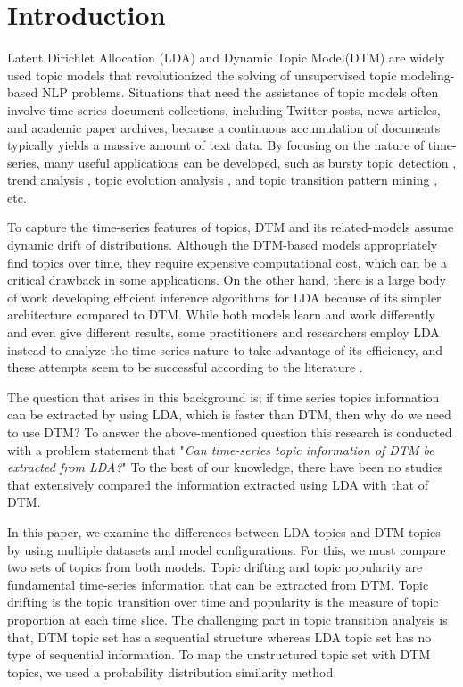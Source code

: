 \chapter{Introduction}
Latent Dirichlet Allocation (LDA) \cite{blei2003latent} and Dynamic Topic Model(DTM) \cite{blei2006dynamic} are widely used topic models that revolutionized the solving of unsupervised topic modeling-based NLP problems.
Situations that need the assistance of topic models often involve time-series document collections, including Twitter posts, news articles, and academic paper archives, because a continuous accumulation of documents typically yields a massive amount of text data.
By focusing on the nature of time-series, many useful applications can be developed, such as bursty topic detection \cite{koike2013time}, trend analysis \cite{kawamae2011trend,zhang2015market,khan2019events}, topic evolution analysis \cite{blei2006dynamic,kalyanam2015context,xie2016topicsketch,amoualian2016streaming,acharya2018dmdtm}, and topic transition pattern mining \cite{kim2015toptrak}, etc.

To capture the time-series features of topics, DTM and its related-models \cite{amoualian2016streaming,acharya2018dmdtm} assume dynamic drift of distributions.
Although the DTM-based models appropriately find topics over time, they require expensive computational cost, which can be a critical drawback in some applications.
On the other hand, there is a large body of work developing efficient inference algorithms for LDA \cite{li2014reducing,yut2017lda,chen2018scalable} because of its simpler architecture compared to DTM.
While both models learn and work differently and even give different results, some practitioners and researchers employ LDA instead to analyze the time-series nature to take advantage of its efficiency, and these attempts seem to be successful according to the literature \cite{khan2019events}.

The question that arises in this background is; if time series topics information can be extracted by using LDA, which is faster than DTM, then why do we need to use DTM?
To answer the above-mentioned question this research is conducted with a problem statement that "\emph{Can time-series topic information of DTM be extracted from LDA?}"
To the best of our knowledge, there have been no studies that extensively compared the information extracted using LDA with that of DTM.

In this paper, we examine the differences between LDA topics and DTM topics by using multiple datasets and model configurations.
For this, we must compare two sets of topics from both models. Topic drifting and topic popularity are fundamental time-series information that can be extracted from DTM. Topic drifting is the topic transition over time and popularity is the measure of topic proportion at each time slice. The challenging part in topic transition analysis is that, DTM topic set has a sequential structure whereas LDA topic set has no type of sequential information. To map the unstructured topic set with DTM topics, we used a probability distribution similarity method.


